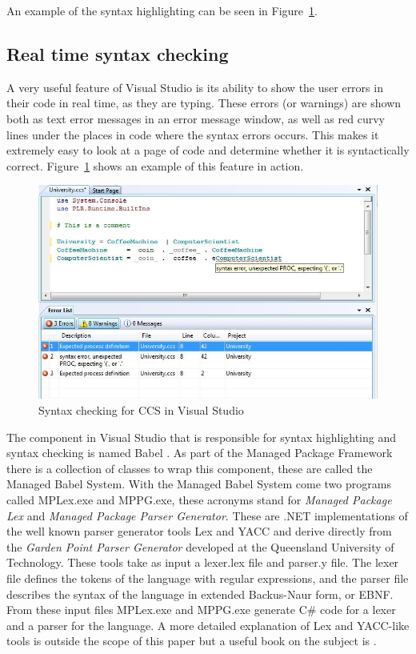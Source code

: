 	An example of the syntax highlighting can be seen in 
	Figure~\ref{fig:syntaxcheck}.
	
	\subsection{Real time syntax checking}\label{sec:syntax_checking}
	A very useful feature of Visual Studio is its ability to show the user 
	errors in their code in real time, as they are typing. These errors (or 
	warnings) are shown both as text error messages in an error message window, 
	as well as red curvy lines under the places in code where the syntax errors 
	occurs. This makes it extremely easy to look at a page of code and determine 
	whether it is syntactically correct. Figure~\ref{fig:syntaxcheck} shows an 
	example of this feature in action.
	
	\begin{figure}[h!]
		\centering
		\includegraphics[scale=0.6]{syntaxcheck.jpg}
		\caption{Syntax checking for CCS in Visual Studio}
		\label{fig:syntaxcheck}
	\end{figure}

	The component in Visual Studio that is responsible for syntax highlighting 
	and syntax checking is named Babel \cite{babel}. As part of the Managed 
	Package Framework there is a collection of classes to wrap this component, 
	these are called the Managed Babel System. With the Managed Babel System 
	come two programs called MPLex.exe and MPPG.exe, these acronyms stand for 
	\textit{Managed Package Lex} and \textit{Managed Package Parser Generator}. 
	These are .NET implementations of the well known parser generator tools Lex 
	and YACC and derive directly from the \textit{Garden Point Parser Generator} 
	\cite{gppg} developed at the Queensland University of Technology. These 
	tools take as input a \textsf{lexer.lex} file and \textsf{parser.y} file. 
	The lexer file defines the tokens of the language with regular expressions, 
	and the parser file describes the syntax of the language in extended 
	Backus-Naur form, or EBNF. From these input files MPLex.exe and MPPG.exe 
	generate C\# code for a lexer and a parser for the language. A more detailed 
	explanation of Lex and YACC-like tools is outside the scope of this paper 
	but a useful book on the subject is \cite{lexyacc}. 
	
